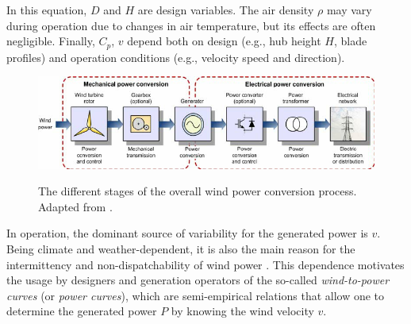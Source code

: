 In this equation, $D$ and $H$ are design variables. The air density $\rho$ may vary during operation due to changes in air temperature, but its effects are often negligible. Finally, $C_p$, $v$ depend both on design (e.g., hub height $H$, blade profiles) and operation conditions (e.g., velocity speed and direction).
\begin{figure}[H] %
	\centering
    \caption{ The different stages of the overall wind power conversion process. Adapted from \cite{molina2011modelling}.}
    \includegraphics[scale=0.6]{wind_power_conversion_stages.png}
	\label{fig:wind_power_conversion_stages}
\end{figure}


In operation, the dominant source of variability for the generated power is $v$. Being climate and weather-dependent, it is also the main reason for the intermittency and non-dispatchability of wind power \cite{demeo2006natural}. This dependence motivates the usage by designers and generation operators of the so-called \textit{wind-to-power curves} (or \textit{power curves}), which are semi-empirical relations that allow one to determine the generated power $P$ by knowing the wind velocity $v$.

